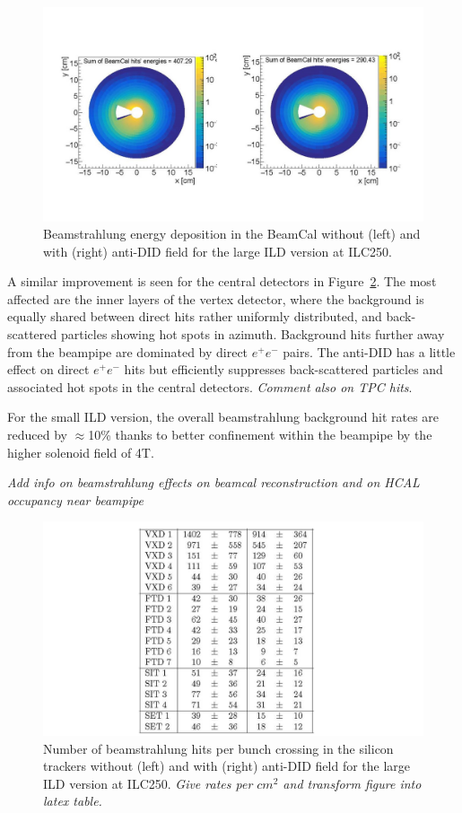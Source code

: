 \begin{figure}[t!]
\includegraphics[width=1.0\hsize]{Integration/fig/BG_beamcal.jpg}
\caption{\label{fig:integration:beamcal}Beamstrahlung energy deposition in the BeamCal without (left) and with (right) anti-DID field for the large ILD version at ILC250. }
\end{figure}

A similar improvement is seen for the central detectors in Figure~\ref{fig:integration:rates}. The most affected are the inner layers of the vertex detector, where the background is equally shared between direct hits rather uniformly distributed, and back-scattered particles showing hot spots in azimuth. Background hits further away from the beampipe are dominated by direct $e^+e^-$ pairs. The anti-DID has a little effect on direct $e^+e^-$ hits but efficiently suppresses back-scattered particles and associated hot spots in the central detectors.
\textit{Comment also on TPC hits}.

For the small ILD version, the overall beamstrahlung background hit rates are reduced by $\approx$10\%  thanks to better confinement within the beampipe by the higher solenoid field of 4T.

\textit{Add info on beamstrahlung effects on beamcal reconstruction and on HCAL occupancy near beampipe}

\begin{figure}[t!]
\includegraphics[width=0.8\hsize]{Integration/fig/BG_rates.jpg}
\caption{\label{fig:integration:rates}Number of beamstrahlung hits per bunch crossing in the silicon trackers without (left) and with (right) anti-DID field for the large ILD version at ILC250. \textit{Give rates per $cm^2$ and transform figure into latex table.}}
\end{figure}


